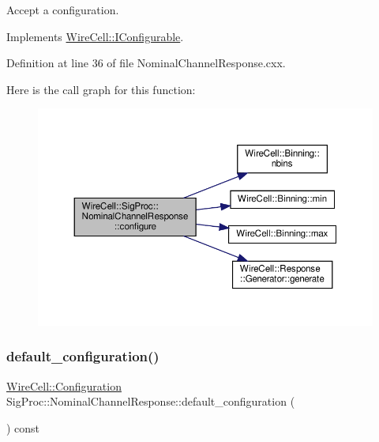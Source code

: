 Accept a configuration. 



Implements \hyperlink{class_wire_cell_1_1_i_configurable_a57ff687923a724093df3de59c6ff237d}{Wire\+Cell\+::\+I\+Configurable}.



Definition at line 36 of file Nominal\+Channel\+Response.\+cxx.

Here is the call graph for this function\+:
\nopagebreak
\begin{figure}[H]
\begin{center}
\leavevmode
\includegraphics[width=350pt]{class_wire_cell_1_1_sig_proc_1_1_nominal_channel_response_a3e1d2284621e69ff712cc6a7a373c797_cgraph}
\end{center}
\end{figure}
\mbox{\label{class_wire_cell_1_1_sig_proc_1_1_nominal_channel_response_a897752df4a2a548028aa1051a0b5b372}} 
\subsubsection{\texorpdfstring{default\+\_\+configuration()}{default\_configuration()}}
{\footnotesize\ttfamily \hyperlink{namespace_wire_cell_a9f705541fc1d46c608b3d32c182333ee}{Wire\+Cell\+::\+Configuration} Sig\+Proc\+::\+Nominal\+Channel\+Response\+::default\+\_\+configuration (\begin{DoxyParamCaption}{ }\end{DoxyParamCaption}) const\hspace{0.3cm}{\ttfamily [virtual]}}



